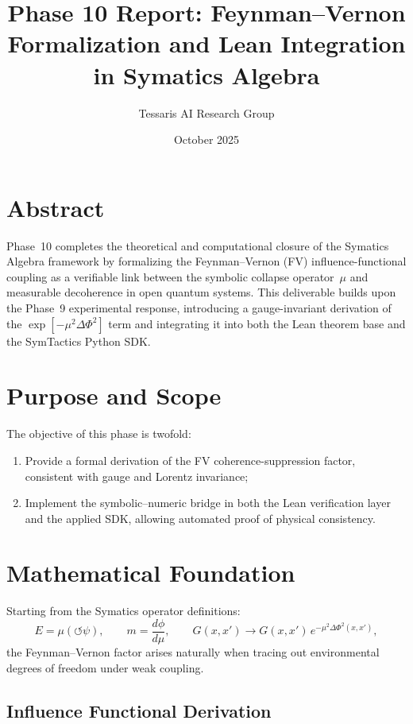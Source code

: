 \documentclass[12pt]{article}
\title{Phase 10 Report: Feynman--Vernon Formalization and Lean Integration in Symatics Algebra}
\author{Tessaris AI Research Group}
\date{October 2025}
\begin{document}
\maketitle

\section*{Abstract}

Phase~10 completes the theoretical and computational closure of the
Symatics Algebra framework by formalizing the Feynman--Vernon (FV)
influence-functional coupling as a verifiable link between the symbolic
collapse operator~$\mu$ and measurable decoherence in open quantum systems.
This deliverable builds upon the Phase~9 experimental response,
introducing a gauge-invariant derivation of the
$\exp[-\mu^2 \Delta\Phi^2]$ term and integrating it into both
the Lean theorem base and the SymTactics Python SDK.

\section{Purpose and Scope}

The objective of this phase is twofold:
\begin{enumerate}[noitemsep]
  \item Provide a formal derivation of the FV coherence-suppression factor,
        consistent with gauge and Lorentz invariance;
  \item Implement the symbolic--numeric bridge in both the Lean verification layer
        and the applied SDK, allowing automated proof of physical consistency.
\end{enumerate}

\section{Mathematical Foundation}

Starting from the Symatics operator definitions:
\[
E = \mu(\circlearrowleft\psi),
\qquad
m = \frac{d\phi}{d\mu},
\qquad
G(x,x') \to G(x,x')\,e^{-\mu^2 \Delta\Phi^2(x,x')},
\]
the Feynman--Vernon factor arises naturally when tracing out
environmental degrees of freedom under weak coupling.

\subsection*{Influence Functional Derivation}
\end{document}

